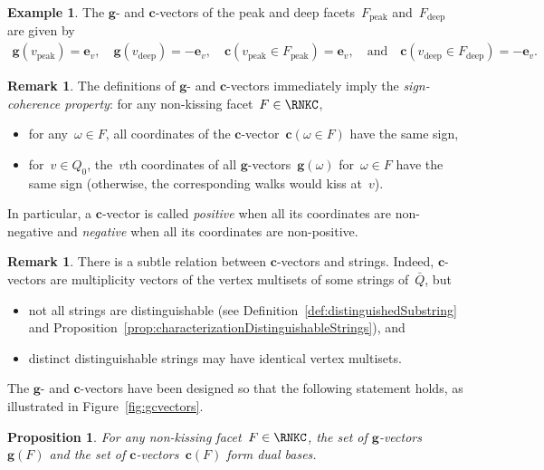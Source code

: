\documentclass{amsart}
\newtheorem{proposition}[theorem]{Proposition}
\theoremstyle{definition}
\newtheorem{example}[theorem]{Example}
\newtheorem{remark}[theorem]{Remark}
\renewcommand{\b}[1]{\mathbf{#1}} %
\newcommand{\fref}[1]{Figure~\ref{#1}} %
\newcommand{\darkblue}{\color{darkblue}} %
\newcommand{\defn}[1]{\textsl{\darkblue #1}} %
\newcommand{\peak}{\mathrm{peak}} %
\newcommand{\deep}{\mathrm{deep}} %
\newcommand{\gvector}[1]{\mathbf{g}(#1)} %
\newcommand{\gvectors}[1]{\mathbf{g}(#1)} %
\newcommand{\cvector}[2]{\mathbf{c}(#1 \in #2)} %
\newcommand{\cvectors}[1]{\mathbf{c}(#1)} %
\begin{document}
\begin{example}
\label{exm:gcvectors}
The $\b{g}$- and $\b{c}$-vectors of the peak and deep facets~$F_\peak$ and~$F_\deep$ are given by
\begin{gather*}
\gvector{v_\peak} = \b{e}_v, \quad 
\gvector{v_\deep} = -\b{e}_v, \quad
\cvector{v_\peak}{F_\peak} = \b{e}_v, \quad\text{and}\quad
\cvector{v_\deep}{F_\deep} = -\b{e}_v.
\end{gather*}
\end{example}

\begin{remark}
\label{rem:signCoherence}
The definitions of $\b{g}$- and $\b{c}$-vectors immediately imply the \defn{sign-coherence property}: for any non-kissing facet~$F \in \RNKC$,
\begin{itemize}
\item for any~$\omega \in F$, all coordinates of the $\b{c}$-vector~$\cvector{\omega}{F}$ have the same sign,
\item for~$v \in Q_0$, the~$v$th coordinates of all $\b{g}$-vectors~$\gvector{\omega}$ for~$\omega \in F$ have the same sign (otherwise, the corresponding walks would kiss at~$v$).
\end{itemize}
In particular, a $\b{c}$-vector is called \defn{positive} when all its coordinates are non-negative and \defn{negative} when all its coordinates are non-positive.
\end{remark}

\begin{remark}
\label{rem:setcvectors}
There is a subtle relation between $\b{c}$-vectors and strings. Indeed, $\b{c}$-vectors are multiplicity vectors of the vertex multisets of some strings of~$\bar Q$, but
\begin{itemize}
\item not all strings are distinguishable (see Definition~\ref{def:distinguishedSubstring} and Proposition~\ref{prop:characterizationDistinguishableStrings}), and
\item distinct distinguishable strings may have identical vertex multisets.
\end{itemize}
\end{remark}

The $\b{g}$- and $\b{c}$-vectors have been designed so that the following statement holds, as illustrated in \fref{fig:gcvectors}.

\begin{proposition}
\label{prop:gvectorscvectorsDualBases}
For any non-kissing facet~$F \in \RNKC$, the set of $\b{g}$-vectors~$\gvectors{F}$ and the set of $\b{c}$-vectors~$\cvectors{F}$ form dual bases. 
\end{proposition}
\end{document}
